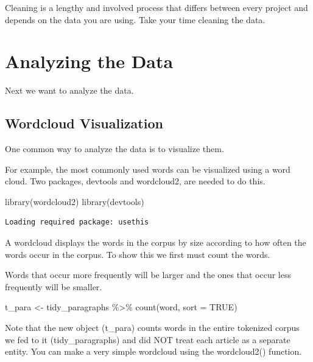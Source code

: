 \documentclass[
  letterpaper,
  DIV=11,
  numbers=noendperiod]{scrartcl}
\newenvironment{Shaded}{\begin{snugshade}}{\end{snugshade}}
\newcommand{\AttributeTok}[1]{\textcolor[rgb]{0.40,0.45,0.13}{#1}}
\newcommand{\ConstantTok}[1]{\textcolor[rgb]{0.56,0.35,0.01}{#1}}
\newcommand{\FunctionTok}[1]{\textcolor[rgb]{0.28,0.35,0.67}{#1}}
\newcommand{\NormalTok}[1]{\textcolor[rgb]{0.00,0.23,0.31}{#1}}
\newcommand{\OtherTok}[1]{\textcolor[rgb]{0.00,0.23,0.31}{#1}}
\newcommand{\SpecialCharTok}[1]{\textcolor[rgb]{0.37,0.37,0.37}{#1}}
\begin{document}
Cleaning is a lengthy and involved process that differs between every
project and depends on the data you are using. Take your time cleaning
the data.

\hypertarget{analyzing-the-data}{%
\section{Analyzing the Data}\label{analyzing-the-data}}

Next we want to analyze the data.

\hypertarget{wordcloud-visualization}{%
\subsection{Wordcloud Visualization}\label{wordcloud-visualization}}

One common way to analyze the data is to visualize them.

For example, the most commonly used words can be visualized using a word
cloud. Two packages, devtools and wordcloud2, are needed to do this.

\begin{Shaded}
\begin{Highlighting}[]
\FunctionTok{library}\NormalTok{(wordcloud2)}
\FunctionTok{library}\NormalTok{(devtools)}
\end{Highlighting}
\end{Shaded}

\begin{verbatim}
Loading required package: usethis
\end{verbatim}

A wordcloud displays the words in the corpus by size according to how
often the words occur in the corpus. To show this we first must count
the words.

Words that occur more frequently will be larger and the ones that occur
less frequently will be smaller.

\begin{Shaded}
\begin{Highlighting}[]
\NormalTok{t\_para }\OtherTok{\textless{}{-}}\NormalTok{ tidy\_paragraphs }\SpecialCharTok{\%\textgreater{}\%}
  \FunctionTok{count}\NormalTok{(word, }\AttributeTok{sort =} \ConstantTok{TRUE}\NormalTok{) }
\end{Highlighting}
\end{Shaded}

Note that the new object (t\_para) counts words in the entire tokenized
corpus we fed to it (tidy\_paragraphs) and did NOT treat each article as
a separate entity. You can make a very simple wordcloud using the
wordcloud2() function.
\end{document}

